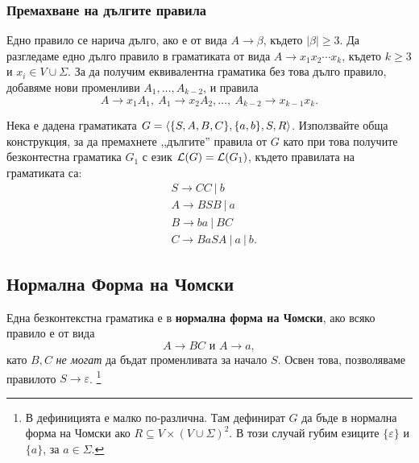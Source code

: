 \subsubsection*{Премахване на дългите правила}

Едно правило се нарича дълго, ако е от вида $A \to \beta$, където $|\beta| \geq 3$.
Да разгледаме едно дълго правило в граматиката от вида $A \to x_1x_2\cdots x_k$, 
където $k \geq 3$ и $x_i \in V \cup \Sigma$. За да получим еквивалентна граматика без това дълго правило,
добавяме нови променливи $A_1,\dots, A_{k-2}$, и правила
\[A \to x_1A_1,\ A_1 \to x_2A_2, \dots,\ A_{k-2} \to x_{k-1}x_k.\]


\begin{problem}
  Нека е дадена граматиката  $G = \langle{\{S,A,B,C\}, \{a,b\}, S, R}\rangle$.
  Използвайте обща конструкция, за да премахнете ,,дългите'' правила от $ G$ като при това получите 
  безконтестна граматика $G_1$ с език $\mathcal{L}(G) = \mathcal{L}(G_1)$, където правилата на граматиката са:
    \begin{align*}
      & S\to CC\ |\ b\\
      & A\to BSB\ |\ a\\
      & B\to ba\ |\ BC\\
      & C\to BaSA\ |\ a\ |\ b.
    \end{align*}
\end{problem}

\subsection{Нормална Форма на Чомски}
Една безконтекстна граматика е в {\bf нормална форма на Чомски}, ако
всяко правило е от вида
\[A \rightarrow BC\mbox{ и }A \rightarrow a,\]
като $B, C$ {\em не могат} да бъдат променливата за начало $S$.
Освен това, позволяваме правилото $S\to\varepsilon$.
\footnote{В \cite[стр. 151]{papadimitriou} дефиницията е малко по-различна.
Там дефинират $G$ да бъде в нормална форма на Чомски ако $R \subseteq V\times(V\cup\Sigma)^2$.
В този случай губим езиците $\{\varepsilon\}$ и $\{a\}$, за $a\in\Sigma$.}

